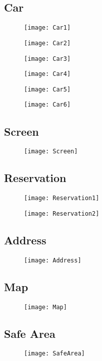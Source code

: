 \subsection{Car}
\begin{figure}[H]
	\centering
	\texttt{[image: Car1]}
\end{figure}
\begin{figure}[H]
	\centering
	\texttt{[image: Car2]}
\end{figure}
\begin{figure}[H]
	\centering
	\texttt{[image: Car3]}
\end{figure}
\begin{figure}[H]
	\centering
	\texttt{[image: Car4]}
\end{figure}
\begin{figure}[H]
	\centering
	\texttt{[image: Car5]}
\end{figure}
\begin{figure}[H]
	\centering
	\texttt{[image: Car6]}
\end{figure}
\subsection{Screen}
\begin{figure}[H]
	\centering
	\texttt{[image: Screen]}
\end{figure}
\subsection{Reservation}
\begin{figure}[H]
	\centering
	\texttt{[image: Reservation1]}
\end{figure}
\begin{figure}[H]
	\centering
	\texttt{[image: Reservation2]}
\end{figure}
\subsection{Address}
\begin{figure}[H]
	\centering
	\texttt{[image: Address]}
\end{figure}
\subsection{Map}
\begin{figure}[H]
	\centering
	\texttt{[image: Map]}
\end{figure}
\subsection{Safe Area}
\begin{figure}[H]
	\centering
	\texttt{[image: SafeArea]}
\end{figure}